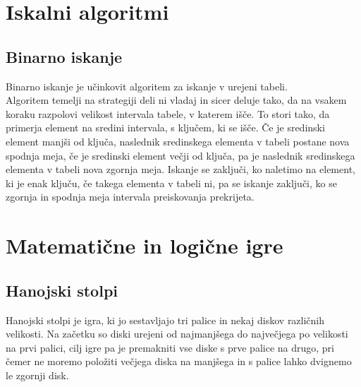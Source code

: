 \documentclass[10pt,a4paper,oneside]{book}
\begin{document}

\chapter{Iskalni algoritmi}
\section{Binarno iskanje}
Binarno iskanje je učinkovit algoritem za iskanje v urejeni tabeli.\\
Algoritem temelji na strategiji deli ni vladaj in sicer deluje tako, da na vsakem koraku razpolovi velikost intervala tabele, v katerem išče. To stori tako, da primerja element na sredini intervala, s ključem, ki se išče. Če je sredinski element manjši od ključa, naslednik sredinskega elementa v tabeli postane nova spodnja meja, če je sredinski element večji od ključa, pa je naslednik sredinskega elementa v tabeli nova zgornja meja. Iskanje se zaključi, ko naletimo na element, ki je enak ključu, če takega elementa v tabeli ni, pa se iskanje zaključi, ko se zgornja in spodnja meja intervala preiskovanja prekrijeta.




\chapter{Matematične in logične igre}
\section{Hanojski stolpi}
Hanojski stolpi je igra, ki jo sestavljajo tri palice in nekaj diskov različnih velikosti. Na začetku so diski urejeni od najmanjšega do največjega po velikosti na prvi palici, cilj igre pa je premakniti vse diske s prve palice na drugo, pri čemer ne moremo položiti večjega diska na manjšega in s palice lahko dvignemo le zgornji disk.
\end{document}
